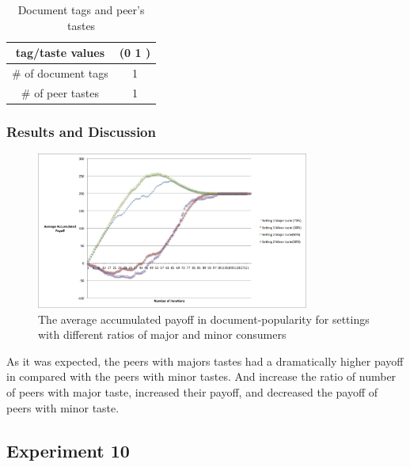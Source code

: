\documentclass [12pt]{article} \usepackage{multicol}
\begin{document}
\begin{table}[h!]
\caption{Document tags and peer's tastes}

\begin{center}

\begin{tabular}{|c|c|}
\hline tag/taste values & (0 1 )\\
\hline \# of document tags   &  1\\ \hline 
\# of peer tastes  &  1 \\ \hline 
\end{tabular}

\end{center}
\label{default}
\end{table}


\subsubsection{Results and Discussion}

\begin{figure}[h!]
\begin{center}
\includegraphics[width=0.8\textwidth,center]{images/EXP9-doc-pop-twoSettings-MajorMinor}
\caption{The average accumulated payoff in document-popularity for settings with different ratios of major and minor consumers}
\end{center}
\end{figure}

As it was expected, the peers with majors tastes had a dramatically higher payoff in compared with the peers with minor tastes.
And increase the ratio of number of peers with major taste, increased their payoff, and decreased the payoff of peers with minor taste. 


\subsection{Experiment 10}
\end{document}
